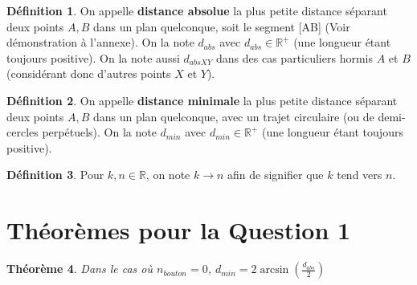 \documentclass[a4paper]{amsart}
\newtheorem{theorem}{Théorème}[section]
\theoremstyle{definition}
\newtheorem{definition}[theorem]{Définition}
\theoremstyle{remark}
\numberwithin{equation}{section}
\begin{document}
\begin{definition}
  On appelle \textbf{distance absolue} la plus petite distance séparant deux points $A,B$ dans un plan quelconque, soit le segment [AB] (Voir démonstration à l'annexe). On la note $d_{abs}$ avec $d_{abs}\in\mathbb{R^+}$ (une longueur étant toujours positive). On la note
  aussi $d_{abs XY}$ dans des cas particuliers hormis $A$ et $B$ (considérant donc d'autres points $X$ et $Y$).
\end{definition}

\begin{definition}
  On appelle \textbf{distance minimale} la plus petite distance séparant deux points $A,B$ dans un plan quelconque, avec un trajet circulaire (ou de demi-cercles perpétuels). On la note $d_{min}$ avec $d_{min}\in\mathbb{R^+}$ (une longueur étant toujours positive).
\end{definition}

\begin{definition}
  Pour $k,n\in\mathbb{R}$, on note $k\to n$ afin de signifier que $k$ tend vers $n$.
\end{definition}

\newpage








\section{Théorèmes pour la Question 1}

\begin{theorem}
  Dans le cas où $n_{bouton}=0$, $d_{min}= 2\arcsin (\frac{d_{abs}}{2})$
\end{theorem}
\end{document}
